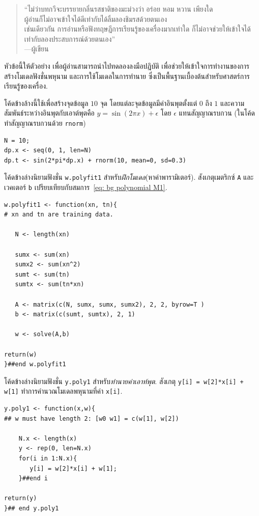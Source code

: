 \begin{verse}
``ไม่ว่าบทกวีจะบรรยายกลิ่นรสชาติของมะม่วงว่า อร่อย หอม หวาน เพียงใด\\
ผู้อ่านก็ไม่อาจเข้าใจได้ดีเท่ากับได้ลิ้มลองชิมรสด้วยตนเอง\\
เช่นเดียวกัน 
การอ่านหรือฟังทฤษฎีการเรียนรู้ของเครื่องมากเท่าใด
ก็ไม่อาจช่วยให้เข้าใจได้เท่ากับลองประสบการณ์ด้วยตนเอง'' \\
---ผู้เขียน
\end{verse}


หัวข้อนี้ให้ตัวอย่าง เพื่อผู้อ่านสามารถนำไปทดลองลงมือปฎิบัติ 
เพื่อช่วยให้เข้าใจการทำงานของการสร้างโมเดลฟังชั่นพหุนาม
และการใช้โมเดลในการทำนาย
ซึ่งเป็นพื้นฐานเบื้องต้นสำหรับศาสตร์การเรียนรู้ของเครื่อง.

โค้ดข้างล้างนี้ใช้เพื่อสร้างจุดข้อมูล $10$ จุด โดยแต่ละจุดข้อมูลมีค่าอินพุตตั้งแต่ $0$ ถึง $1$ 
และความสัมพันธ์ระหว่างอินพุตกับเอาต์พุตคือ $y = \sin(2 \pi x) + \epsilon$ 
โดย $\epsilon$ แทนสัญญาณรบกวน (ในโค้ดทำสัญญาณรบกวนด้วย \texttt{rnorm})
\begin{verbatim}
N = 10;
dp.x <- seq(0, 1, len=N)
dp.t <- sin(2*pi*dp.x) + rnorm(10, mean=0, sd=0.3)
\end{verbatim}

โค้ดข้างล่างนิยามฟังชั่น \texttt{w.polyfit1}  
สำหรับ\textit{ฝึกโมเดล}(หาค่าพารามิเตอร์).
สังเกตุเมตริกซ์ \texttt{A} และเวคเตอร์ \texttt{b} เปรียบเทียบกับสมการ~\ref{eq: bg polynomial M1}.

\begin{verbatim}
w.polyfit1 <- function(xn, tn){
# xn and tn are training data.
	
   N <- length(xn)

   sumx <- sum(xn)
   sumx2 <- sum(xn^2)
   sumt <- sum(tn)
   sumtx <- sum(tn*xn)

   A <- matrix(c(N, sumx, sumx, sumx2), 2, 2, byrow=T )
   b <- matrix(c(sumt, sumtx), 2, 1)
   
   w <- solve(A,b)
   
return(w)
}##end w.polyfit1
\end{verbatim}

โค้ดข้างล่างนิยามฟังชั่น \texttt{y.poly1} สำหรับ\textit{ทำนายค่าเอาท์พุต}.
สังเกตุ \texttt{y[i] = w[2]*x[i] + w[1]} ทำการคำนวณโมเดลพหุนามที่ค่า \texttt{x[i]}.

\begin{verbatim}
y.poly1 <- function(x,w){
## w must have length 2: [w0 w1] = c(w[1], w[2])

	N.x <- length(x)
	y <- rep(0, len=N.x)
	for(i in 1:N.x){
	   y[i] = w[2]*x[i] + w[1];
	}##end i
	
return(y)
}## end y.poly1
\end{verbatim}

